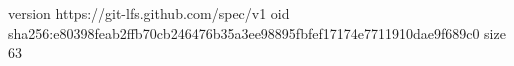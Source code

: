 version https://git-lfs.github.com/spec/v1
oid sha256:e80398feab2ffb70cb246476b35a3ee98895fbfef17174e7711910dae9f689c0
size 63
